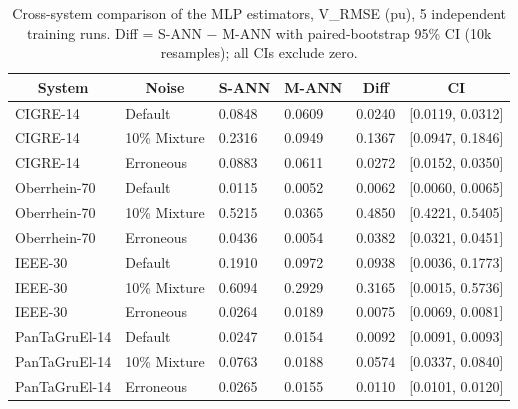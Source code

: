 \begin{table}[htbp]
\centering
\caption{Cross-system comparison of the MLP estimators, V\_RMSE (pu), 5 independent training runs. Diff = S-ANN $-$ M-ANN with paired-bootstrap 95\% CI (10k resamples); all CIs exclude zero.}
\label{tab:cross}
\footnotesize
\begin{tabular}{llllrr}
\toprule
\multicolumn{1}{c}{System} & \multicolumn{1}{c}{Noise} & \multicolumn{1}{c}{S-ANN} & \multicolumn{1}{c}{M-ANN} & \multicolumn{1}{c}{Diff} & \multicolumn{1}{c}{CI} \\
\midrule
CIGRE-14 & Default & 0.0848 & 0.0609 & 0.0240 & [0.0119, 0.0312] \\
CIGRE-14 & 10\% Mixture & 0.2316 & 0.0949 & 0.1367 & [0.0947, 0.1846] \\
CIGRE-14 & Erroneous & 0.0883 & 0.0611 & 0.0272 & [0.0152, 0.0350] \\
Oberrhein-70 & Default & 0.0115 & 0.0052 & 0.0062 & [0.0060, 0.0065] \\
Oberrhein-70 & 10\% Mixture & 0.5215 & 0.0365 & 0.4850 & [0.4221, 0.5405] \\
Oberrhein-70 & Erroneous & 0.0436 & 0.0054 & 0.0382 & [0.0321, 0.0451] \\
IEEE-30 & Default & 0.1910 & 0.0972 & 0.0938 & [0.0036, 0.1773] \\
IEEE-30 & 10\% Mixture & 0.6094 & 0.2929 & 0.3165 & [0.0015, 0.5736] \\
IEEE-30 & Erroneous & 0.0264 & 0.0189 & 0.0075 & [0.0069, 0.0081] \\
PanTaGruEl-14 & Default & 0.0247 & 0.0154 & 0.0092 & [0.0091, 0.0093] \\
PanTaGruEl-14 & 10\% Mixture & 0.0763 & 0.0188 & 0.0574 & [0.0337, 0.0840] \\
PanTaGruEl-14 & Erroneous & 0.0265 & 0.0155 & 0.0110 & [0.0101, 0.0120] \\
\bottomrule
\end{tabular}
\end{table}
